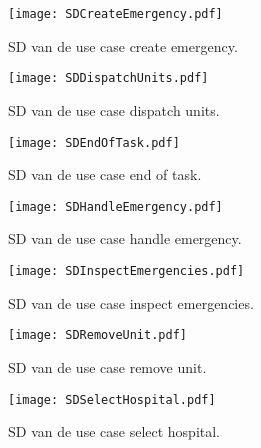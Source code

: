 \begin{figure}[h!]
  \texttt{[image: SDCreateEmergency.pdf]}
  \caption{SD van de use case create emergency.}
  \label{fig:sdAST}
\end{figure}

\begin{figure}[h!]
  \texttt{[image: SDDispatchUnits.pdf]}
  \caption{SD van de use case dispatch units.}
  \label{fig:sdAST}
\end{figure}

\begin{figure}[h!]
  \texttt{[image: SDEndOfTask.pdf]}
  \caption{SD van de use case end of task.}
  \label{fig:sdAST}
\end{figure}

\begin{figure}[h!]
  \texttt{[image: SDHandleEmergency.pdf]}
  \caption{SD van de use case handle emergency.}
  \label{fig:sdAST}
\end{figure}

\begin{figure}[h!]
  \texttt{[image: SDInspectEmergencies.pdf]}
  \caption{SD van de use case inspect emergencies.}
  \label{fig:sdAST}
\end{figure}

\begin{figure}[h!]
  \texttt{[image: SDRemoveUnit.pdf]}
  \caption{SD van de use case remove unit.}
  \label{fig:sdAST}
\end{figure}

\begin{figure}[h!]
  \centering
  \texttt{[image: SDSelectHospital.pdf]}
  \caption{SD van de use case select hospital.}
  \label{fig:sdAST}
\end{figure}